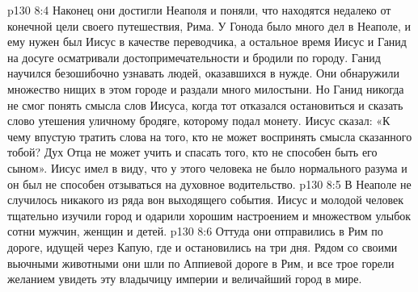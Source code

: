 \vs p130 8:4 \pc Наконец они достигли Неаполя и поняли, что находятся недалеко от конечной цели своего путешествия, Рима. У Гонода было много дел в Неаполе, и ему нужен был Иисус в качестве переводчика, а остальное время Иисус и Ганид на досуге осматривали достопримечательности и бродили по городу. Ганид научился безошибочно узнавать людей, оказавшихся в нужде. Они обнаружили множество нищих в этом городе и раздали много милостыни. Но Ганид никогда не смог понять смысла слов Иисуса, когда тот отказался остановиться и сказать слово утешения уличному бродяге, которому подал монету. Иисус сказал: «К чему впустую тратить слова на того, кто не может воспринять смысла сказанного тобой? Дух Отца не может учить и спасать того, кто не способен быть его сыном». Иисус имел в виду, что у этого человека не было нормального разума и он был не способен отзываться на духовное водительство.
\vs p130 8:5 В Неаполе не случилось никакого из ряда вон выходящего события. Иисус и молодой человек тщательно изучили город и одарили хорошим настроением и множеством улыбок сотни мужчин, женщин и детей.
\vs p130 8:6 Оттуда они отправились в Рим по дороге, идущей через Капую, где и остановились на три дня. Рядом со своими вьючными животными они шли по Аппиевой дороге в Рим, и все трое горели желанием увидеть эту владычицу империи и величайший город в мире.
